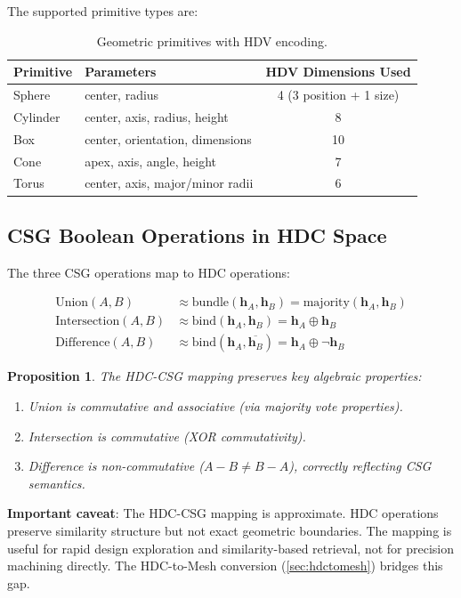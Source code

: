 \documentclass[11pt,a4paper]{article}
\newtheorem{proposition}{Proposition}
\begin{document}
The supported primitive types are:

\begin{table}[h]
\centering
\caption{Geometric primitives with HDV encoding.}
\label{tab:primitives}
\begin{tabular}{@{}llc@{}}
\toprule
Primitive & Parameters & HDV Dimensions Used \\
\midrule
Sphere & center, radius & 4 (3 position + 1 size) \\
Cylinder & center, axis, radius, height & 8 \\
Box & center, orientation, dimensions & 10 \\
Cone & apex, axis, angle, height & 7 \\
Torus & center, axis, major/minor radii & 6 \\
\bottomrule
\end{tabular}
\end{table}

\subsection{CSG Boolean Operations in HDC Space}

The three CSG operations map to HDC operations:

\begin{align}
\text{Union}(A, B) &\approx \text{bundle}(\mathbf{h}_A, \mathbf{h}_B) = \text{majority}(\mathbf{h}_A, \mathbf{h}_B) \\
\text{Intersection}(A, B) &\approx \text{bind}(\mathbf{h}_A, \mathbf{h}_B) = \mathbf{h}_A \oplus \mathbf{h}_B \\
\text{Difference}(A, B) &\approx \text{bind}(\mathbf{h}_A, \overline{\mathbf{h}_B}) = \mathbf{h}_A \oplus \lnot\mathbf{h}_B
\end{align}

\begin{proposition}
The HDC-CSG mapping preserves key algebraic properties:
\begin{enumerate}[nosep]
    \item Union is commutative and associative (via majority vote properties).
    \item Intersection is commutative (XOR commutativity).
    \item Difference is non-commutative ($A - B \neq B - A$), correctly reflecting CSG semantics.
\end{enumerate}
\end{proposition}

\textbf{Important caveat}: The HDC-CSG mapping is approximate. HDC operations preserve similarity structure but not exact geometric boundaries. The mapping is useful for rapid design exploration and similarity-based retrieval, not for precision machining directly. The HDC-to-Mesh conversion (\cref{sec:hdctomesh}) bridges this gap.
\end{document}
